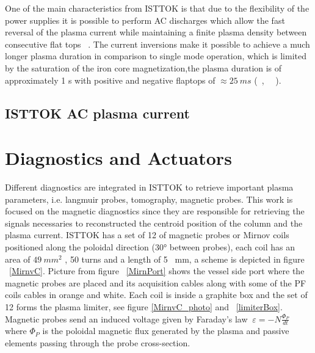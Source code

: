 One of the main characteristics from ISTTOK  is that due to the flexibility of the power supplies it is possible  to perform  AC  discharges  which  allow the fast reversal of the plasma current while maintaining a finite plasma density between consecutive flat tops  ~\cite{density}. The current inversions make it possible to achieve a much longer plasma duration in comparison to single mode operation, which is limited by the saturation of the iron core magnetization,the plasma duration is of approximately 1 s with positive and negative flaptops of $\approx 25~ms$ (~\cite{Fernandes1998}, ~\cite{Carvalho2015}~).




\subsection{ISTTOK AC plasma current}


\section{Diagnostics and Actuators}

Different  diagnostics are integrated in ISTTOK to retrieve important plasma parameters, i.e. langmuir probes, tomography, magnetic probes. This work is focused on the magnetic diagnostics  since they are responsible for  retrieving the signals necessaries to reconstructed the centroid position of the column and the plasma current. ISTTOK has a set of 12 of magnetic  probes or Mirnov coils positioned along the poloidal direction (30° between  probes), each coil has an area of $49 ~mm^2$ , 50 turns and a length of 5 ~mm, a scheme is depicted in figure ~\ref{MirnvC}. Picture from figure ~\ref{MirnPort} shows the vessel side port where the magnetic probes are  placed and its acquisition cables along with some of the PF coils cables in orange and white. Each coil is inside a graphite box and the set of 12 forms the plasma limiter, see figure \ref{MirnvC_photo} and ~\ref{limiterBox}. Magnetic probes send an induced voltage given by Faraday's law $~\varepsilon = -N\frac{\Phi_P}{dt}$ where $\Phi_P$ is the poloidal magnetic flux generated by the plasma and passive elements passing through the probe cross-section.
\smallskip



